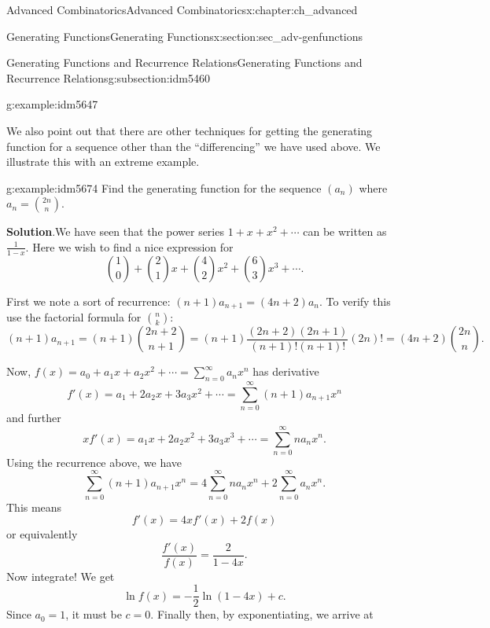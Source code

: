 \documentclass[oneside,10pt,]{book}
\numberwithin{equation}{chapter}
\begin{document}
\begin{chapterptx}{Advanced Combinatorics}{}{Advanced Combinatorics}{}{}{x:chapter:ch_advanced}
\begin{sectionptx}{Generating Functions}{}{Generating Functions}{}{}{x:section:sec_adv-genfunctions}
\begin{subsectionptx}{Generating Functions and Recurrence Relations}{}{Generating Functions and Recurrence Relations}{}{}{g:subsection:idm5460}
\begin{example}{}{g:example:idm5647}
\end{example}
We also point out that there are other techniques for getting the generating function for a sequence other than the ``differencing'' we have used above.  We illustrate this with an extreme example.%
\begin{example}{}{g:example:idm5674}%
Find the generating function for the sequence \((a_n)\) where \(a_n = \binom{2n}{n}\).%
\par\smallskip%
\noindent\textbf{Solution}.\hypertarget{g:solution:idm5679}{}\quad{}We have seen that the power series \(1 + x + x^2 + \cdots \) can be written as \(\frac{1}{1-x}\).  Here we wish to find a nice expression for%
\begin{equation*}
\binom{1}{0} + \binom{2}{1}x + \binom{4}{2}x^2 + \binom{6}{3}x^3+ \cdots\text{.}
\end{equation*}
%
\par
First we note a sort of recurrence: \((n+1)a_{n+1} = (4n+2)a_n\).  To verify this use the factorial formula for \(\binom{n}{k}\):%
\begin{equation*}
(n+1)a_{n+1} = (n+1)\binom{2n+2}{n+1} = (n+1)\frac{(2n+2)(2n+1)}{(n+1)!(n+1)!}(2n)! = (4n+2)\binom{2n}{n} \text{.}
\end{equation*}
%
\par
Now, \(f(x) = a_0 + a_1x + a_2x^2 + \cdots = \sum_{n=0}^\infty a_nx^n\) has derivative%
\begin{equation*}
f'(x) = a_1 + 2a_2x + 3a_3x^2 + \cdots = \sum_{n=0}^\infty (n+1)a_{n+1}x^n
\end{equation*}
and further%
\begin{equation*}
xf'(x) = a_1x + 2a_2x^2 + 3a_3x^3 + \cdots = \sum_{n=0}^\infty na_nx^n\text{.}
\end{equation*}
Using the recurrence above, we have%
\begin{equation*}
\sum_{n=0}^\infty (n+1)a_{n+1}x^n = 4\sum_{n=0}^\infty na_nx^n + 2\sum_{n=0}^\infty a_nx^n\text{.}
\end{equation*}
This means%
\begin{equation*}
f'(x) = 4xf'(x) + 2f(x)
\end{equation*}
or equivalently%
\begin{equation*}
\frac{f'(x)}{f(x)} = \frac{2}{1-4x}\text{.}
\end{equation*}
Now integrate!  We get%
\begin{equation*}
\ln f(x) = -\frac{1}{2}\ln(1-4x) + c\text{.}
\end{equation*}
Since \(a_0 =1\), it must be \(c = 0\).  Finally then, by exponentiating, we arrive at%

\end{example}
\end{subsectionptx}
\end{sectionptx}
\end{chapterptx}
\end{document}
